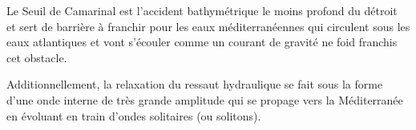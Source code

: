 Le Seuil de Camarinal est l'accident bathymétrique le moins profond du détroit et sert de barrière à franchir pour les eaux méditerranéennes qui circulent sous les eaux atlantiques et vont s'écouler comme un courant de gravité ne foid franchis cet obstacle. \citep{wesson_1994,garcia-lafuente_2011}

Additionnellement, la relaxation du ressaut hydraulique se fait sous la forme d'une onde interne de très grande amplitude qui se propage vers la Méditerranée en évoluant en train d'ondes solitaires (ou solitons). 






















